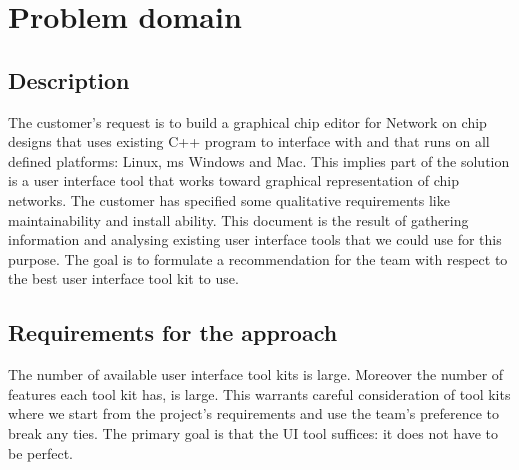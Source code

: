 \section{Problem domain}
\subsection{Description}

The customer's request is to build a graphical chip editor for Network on chip
designs that uses existing C++ program to interface with and that runs on all
defined platforms: Linux, ms Windows and Mac. This implies part of the solution
is a user interface tool that works toward graphical representation of chip
networks. The customer has specified some qualitative requirements like 
maintainability and install ability. This document is the result of gathering 
information and analysing existing user interface tools that we could use for 
this purpose. The goal is to formulate a recommendation for the team with respect
to the best user interface tool kit to use.

\subsection{Requirements for the approach}

The number of available user interface tool kits is large.  Moreover the number
of features each tool kit has, is large. This warrants careful consideration of
tool kits where we start from the project's requirements and use the team's
preference to break any ties.  The primary goal is that the UI tool suffices:
it does not have to be perfect.
